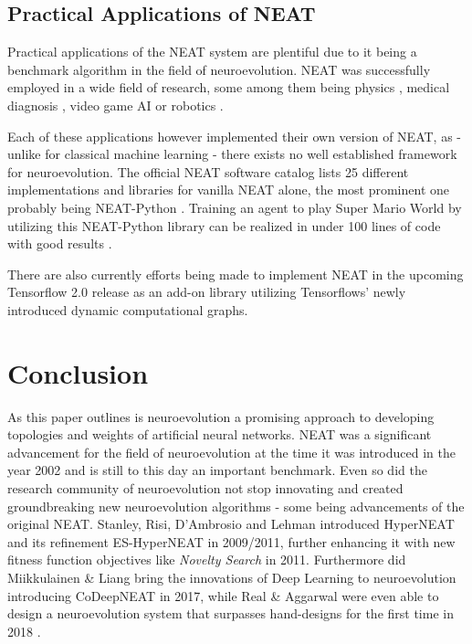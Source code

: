 \documentclass[journal, a4paper]{IEEEtran}
\begin{document}

\subsection{Practical Applications of NEAT}

Practical applications of the NEAT system are plentiful due to it being a benchmark algorithm in the field of neuroevolution. NEAT was successfully employed in a wide field of research, some among them being physics \cite{aal09}, medical diagnosis \cite{fra18}, video game AI \cite{hau12} or robotics \cite{cul15}.

Each of these applications however implemented their own version of NEAT, as - unlike for classical machine learning - there exists no well established framework for neuroevolution. The official NEAT software catalog \cite{neat_software19} lists 25 different implementations and libraries for vanilla NEAT alone, the most prominent one probably being NEAT-Python \cite{cod19}. Training an agent to play Super Mario World by utilizing this NEAT-Python library can be realized in under 100 lines of code with good results \cite{pau19_smw}.

There are also currently efforts being made \cite{pau19_tefne} to implement NEAT in the upcoming Tensorflow 2.0 \cite{tf_beta19} release as an add-on \cite{tf_addons19} library utilizing Tensorflows' newly introduced dynamic computational graphs.




\section{Conclusion}

As this paper outlines is neuroevolution a promising approach to developing topologies and weights of artificial neural networks. NEAT was a significant advancement for the field of neuroevolution at the time it was introduced in the year 2002 and is still to this day an important benchmark. Even so did the research community of neuroevolution not stop innovating and created groundbreaking new neuroevolution algorithms - some being advancements of the original NEAT. Stanley, Risi, D'Ambrosio and Lehman introduced HyperNEAT \cite{sta09} and its refinement ES-HyperNEAT \cite{ris11} in 2009/2011, further enhancing it with new fitness function objectives like \textit{Novelty Search} \cite{leh11} in 2011. Furthermore did Miikkulainen \& Liang bring the innovations of Deep Learning to neuroevolution introducing CoDeepNEAT \cite{mii17} in 2017, while Real \& Aggarwal were even able to design a neuroevolution system that surpasses hand-designs for the first time in 2018 \cite{rea19}.
\end{document}
